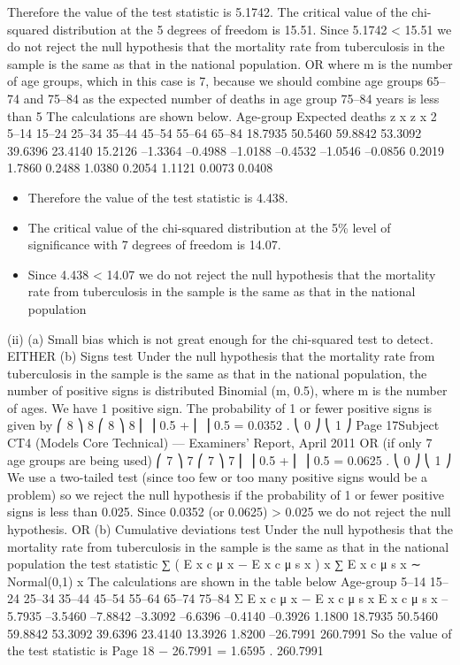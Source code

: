 \documentclass[a4paper,12pt]{article}
\begin{document}
\begin{enumerate}
Therefore the value of the test statistic is 5.1742.
The critical value of the chi-squared distribution at the 5%
degrees of freedom is 15.51.
Since 5.1742 < 15.51 we do not reject the null hypothesis that the mortality rate from tuberculosis in the sample is the same as that in the national population.
OR
where m is the number of age groups, which in this case is 7, because we should combine age groups 65–74 and 75–84 as the expected number of deaths in age group 75–84 years is less than 5
The calculations are shown below.
Age-group Expected deaths z x z x 2
5–14
15–24
25–34
35–44
45–54
55–64
65–84 18.7935
50.5460
59.8842
53.3092
39.6396
23.4140
15.2126 –1.3364
–0.4988
–1.0188
–0.4532
–1.0546
–0.0856
0.2019 1.7860
0.2488
1.0380
0.2054
1.1121
0.0073
0.0408
\begin{itemize}
\item Therefore the value of the test statistic is 4.438.
\item The critical value of the chi-squared distribution at the 5\% level of significance with 7
degrees of freedom is 14.07.
\item Since 4.438 < 14.07 we do not reject the null hypothesis that the mortality rate from tuberculosis in the sample is the same as that in the national population
\end{itemize}
(ii)
(a)
Small bias which is not great enough for the chi-squared test to detect.
EITHER
(b)
Signs test
Under the null hypothesis that the mortality rate from tuberculosis in the sample is the same as that in the national population,
the number of positive signs is distributed Binomial (m, 0.5), where m is the number of ages.
We have 1 positive sign.
The probability of 1 or fewer positive signs is given by
⎛ 8 ⎞ 8 ⎛ 8 ⎞ 8
⎜ ⎟ 0.5 + ⎜ ⎟ 0.5 = 0.0352 .
⎝ 0 ⎠
⎝ 1 ⎠
Page 17Subject CT4 (Models Core Technical) — Examiners’ Report, April 2011
OR (if only 7 age groups are being used)
⎛ 7 ⎞ 7 ⎛ 7 ⎞ 7
⎜ ⎟ 0.5 + ⎜ ⎟ 0.5 = 0.0625 .
⎝ 0 ⎠
⎝ 1 ⎠
We use a two-tailed test (since too few or too many positive signs would be a
problem)
so we reject the null hypothesis if the probability of 1 or fewer positive signs
is less than 0.025.
Since 0.0352 (or 0.0625) > 0.025
we do not reject the null hypothesis.
OR
(b)
Cumulative deviations test
Under the null hypothesis that the mortality rate from tuberculosis in the sample is the same as that in the national population
the test statistic
∑ ( E x c μ x − E x c μ s x )
x
∑ E x c μ s x
∼ Normal(0,1)
x
The calculations are shown in the table below
Age-group
5–14
15–24
25–34
35–44
45–54
55–64
65–74
75–84
Σ
E x c μ x − E x c μ s x E x c μ s x
–5.7935
–3.5460
–7.8842
–3.3092
–6.6396
–0.4140
–0.3926
1.1800 18.7935
50.5460
59.8842
53.3092
39.6396
23.4140
13.3926
1.8200
–26.7991 260.7991
So the value of the test statistic is
Page 18
− 26.7991
= 1.6595 .
260.7991


\end{enumerate}
\end{document}
